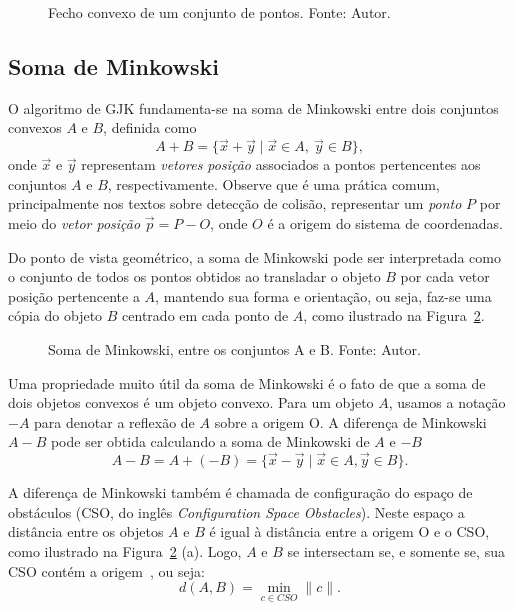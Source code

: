 \begin{figure}[htb]
	\centering
	
	\caption{Fecho convexo de um conjunto de pontos. Fonte: Autor.}
	\label{fig:convex-hull}
\end{figure}

\subsection*{Soma de Minkowski}

O algoritmo de GJK fundamenta-se na soma de Minkowski entre dois conjuntos convexos $A$ e $B$, definida como
$$
A + B = \{ \vec x + \vec y \mid \vec x \in A,\ \vec y \in B \},
$$
onde $ \vec x $ e $ \vec y $ representam \textit{vetores posição} associados a pontos pertencentes aos conjuntos $A$ e $B$, respectivamente. Observe que é uma prática comum, principalmente nos textos sobre detecção de colisão, representar um \textit{ponto} $P$ por meio do \textit{vetor posição} $\vec p = P - O$, onde $O$ é a origem do sistema de coordenadas. 

Do ponto de vista geométrico, a soma de Minkowski pode ser interpretada como o conjunto de todos os pontos obtidos ao transladar o objeto $B$ por cada vetor posição pertencente a $A$, mantendo sua forma e orientação, ou seja, faz-se uma cópia do objeto $B$ centrado em cada ponto de $A$, como ilustrado na Figura~\ref{fig:soma-minkowski}.

\begin{figure}[htb]
	\centering
	
	\caption{Soma de Minkowski, entre os conjuntos A e B. Fonte: Autor.}
	\label{fig:soma-minkowski}
\end{figure}
Uma propriedade muito útil da soma de Minkowski é o fato de que a soma de dois objetos convexos é um objeto convexo. Para um objeto $A$, usamos a notação $-A$ para denotar a reflexão de $A$ sobre a origem O. A diferença de Minkowski $A-B$ pode ser obtida calculando a soma de Minkowski de $A$ e $-B$
$$
	A - B = A + (-B) = \{\vec x - \vec y \mid \vec x \in A, \vec y \in B \}.
$$

A diferença de Minkowski também é chamada de configuração do espaço de obstáculos (CSO, do inglês \textit{Configuration Space Obstacles}). Neste espaço a distância entre os objetos $A$ e $B$ é igual à distância entre a origem O e o CSO, como ilustrado na Figura~\ref{fig:soma-minkowski} (a). Logo, $A$ e $B$ se intersectam se, e somente se, sua CSO contém a origem~\cite{linahan2015geometricgjk}, ou seja:
$$
d(A,B) = \min_{c \in CSO} \| c \|.
$$

